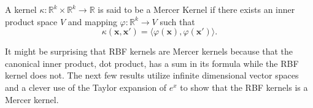 \begin{definition}
    A kernel $\kappa: \mathbb{R}^{k} \times \mathbb{R}^{k} \to \mathbb{R}$
    is said to be a Mercer Kernel if there exists an inner product space
    $V$ and mapping $\varphi: \mathbb{R}^{k} \to V$ such that
    \begin{equation*}
        \kappa(\mathbf{x}, \mathbf{x}') = \langle \varphi(\mathbf{x}), \varphi(\mathbf{x}') \rangle.
    \end{equation*}
\end{definition}

It might be surprising that RBF kernels are Mercer kernels because that the canonical inner product, dot product, has a sum in its formula while the RBF kernel does not.
The next few results utilize infinite dimensional vector spaces and a clever use of the Taylor expansion of $e^{x}$ to show that the RBF kernels is a Mercer kernel.

